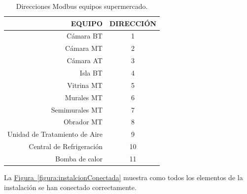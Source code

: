 \begin{table}[H]
  \begin{center}
    \setlength\arrayrulewidth{2pt}
    \begin{tabular}{| r | c |}
      \hhline{|*{2}{-}}
      \cellcolor{lightgray}\textbf{\footnotesize{EQUIPO}} & \cellcolor{lightgray}\textbf{\footnotesize{DIRECCIÓN}}\\ \hline
      \footnotesize{Cámara BT} & 1 \\ \hline
      \footnotesize{Cámara MT} & 2 \\ \hline
      \footnotesize{Cámara AT} & 3 \\ \hline
      \footnotesize{Isla BT} & 4 \\ \hline
      \footnotesize{Vitrina MT} & 5 \\ \hline
      \footnotesize{Murales MT} & 6 \\ \hline
      \footnotesize{Semimurales MT} & 7 \\ \hline
      \footnotesize{Obrador MT} & 8 \\ \hline
      \footnotesize{Unidad de Tratamiento de Aire} & 9 \\ \hline
      \footnotesize{Central de Refrigeración} & 10 \\ \hline
      \footnotesize{Bomba de calor} & 11 \\ \hline
    \end{tabular}
    \caption{Direcciones Modbus equipos supermercado.}
    \label{tab:direccionesModbus}
  \end{center}
\end{table} 

\vspace*{\fill}

La \hyperref[figura:instalcionConectada]{Figura~\ref{figura:instalcionConectada}} muestra como todos los elementos de la instalación se han conectado correctamente.

\clearpage
\vspace*{\fill}

